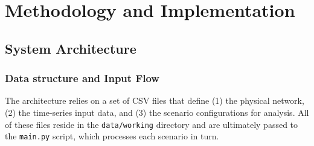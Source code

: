 \newpage
\section{Methodology and Implementation}



\subsection{System Architecture}
\label{sec:system_architecture}

\subsubsection{Data structure and Input Flow}
\label{sec:input_flow}
The architecture relies on a set of CSV files that define (1) the physical network, (2) the time-series input data, 
and (3) the scenario configurations for analysis. All of these files reside in the \texttt{data/working} directory 
and are ultimately passed to the \texttt{main.py} script, which processes each scenario in turn.

